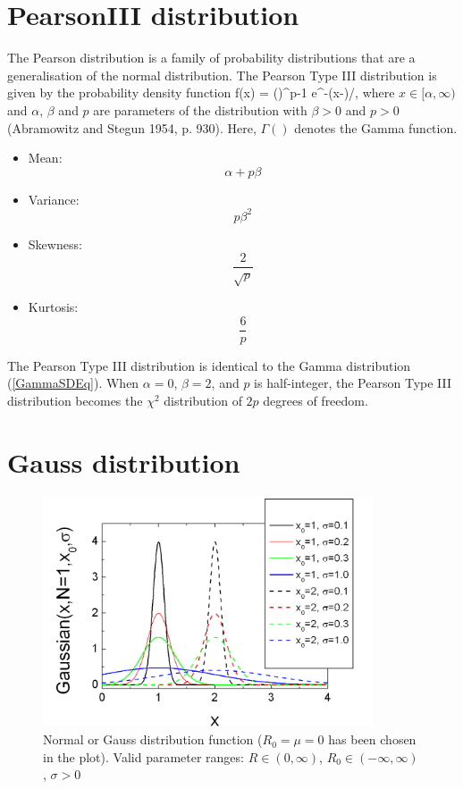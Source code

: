 \clearpage
\section{PearsonIII distribution}
\label{sec:PearsonIIIdist}

The Pearson distribution is a family of probability distributions
that are a generalisation of the normal distribution. The Pearson
Type III distribution is given by the probability density function
\BE
    f(x) =  \left(\right)^{p-1} e^{-(x-\alpha)/\beta}, \!
\EE where $x \in [\alpha,\infty)$ and $\alpha$, $\beta$ and $p$
are parameters of the distribution with $\beta > 0$ and $p > 0$
(Abramowitz and Stegun 1954, p. 930). Here, $\Gamma ()$ denotes
the Gamma function.
\begin{itemize}
\item Mean:
$$
    \alpha + p\beta
$$
\item Variance:
$$
    p\beta^2
$$
\item Skewness:
$$
    \frac{2}{\sqrt{p}}
$$
\item Kurtosis:
$$
    \frac{6}{p}
$$
\end{itemize}
The Pearson Type III distribution is identical to the Gamma
distribution (\ref{GammaSDEq}). When $\alpha=0$, $\beta=2$, and
$p$ is half-integer, the Pearson Type III distribution becomes the
$\chi^2$ distribution of $2p$ degrees of freedom.


\clearpage
\section{Gauss distribution}
\label{sec:GaussSD}
\begin{figure}[htb]
\begin{center}
\includegraphics[width=0.873\textwidth]{GaussSD.png}
\end{center}
\caption{Normal or Gauss distribution function ($R_0=\mu=0$ has
been chosen in the plot). Valid parameter ranges: $R \in
(0,\infty)$, $R_0 \in (-\infty,\infty)$, $\sigma>0$}
\label{NormalDistr}
\end{figure}

